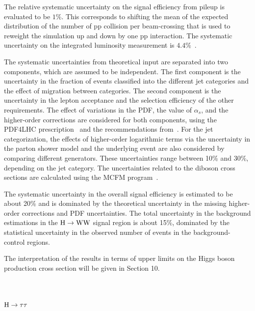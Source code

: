 \documentclass[11pt,twoside,a4paper,cmspaper,final,collab]{cms-tdr}
\begin{document}
The relative systematic uncertainty on the signal efficiency from pileup is evaluated to be $1\%$.
This corresponds to shifting the mean of the
expected distribution of the number of pp collision per beam-crossing that is used to reweight the simulation
up and down by one pp interaction.
The systematic uncertainty on the integrated luminosity measurement is $4.4\%$~\cite{CMS:2012jza}.

The systematic uncertainties from theoretical input  are separated
into two components, which are assumed to be
independent. The first component is the uncertainty in the fraction of
events classified into the different jet categories and the effect of migration between categories.
The second component is the uncertainty in
the lepton acceptance and the selection efficiency of the other
requirements. The effect of variations in the PDF, the
value of $\alpha_{s}$, and the higher-order corrections
are considered for both components, using the PDF4LHC
prescription~\cite{Botje:2011sn,Alekhin:2011sk,Lai:2010vv,Martin:2009iq,Ball:2011mu} and the recommendations
from~\cite{LHCHiggsCrossSectionWorkingGroup:2011ti}.
For the jet categorization, the effects of higher-order logarithmic terms via
the uncertainty in the parton shower model and the underlying event
are also considered by comparing different generators. These uncertainties range
between 10\% and 30\%, depending on the jet category.
The uncertainties related to the diboson
cross sections are calculated using the {\sc MCFM} program~\cite{MCFM}.

The systematic uncertainty in the overall signal efficiency is estimated to be about 20\%
and is dominated by the theoretical uncertainty in the missing
higher-order corrections and PDF uncertainties. The total uncertainty in the background estimations
in the $\mathrm{H}\to\mathrm{W}\mathrm{W}$ signal region is about 15\%, dominated by the
statistical uncertainty in the observed number of events in the background-control regions.

The interpretation of the results in terms of upper limits on the
Higgs boson production cross section will be given in Section 10.
\section{\texorpdfstring{$\mathrm{H}\to\tau\tau$}{H to tau tau}\label{sec:htt}}
\end{document}
